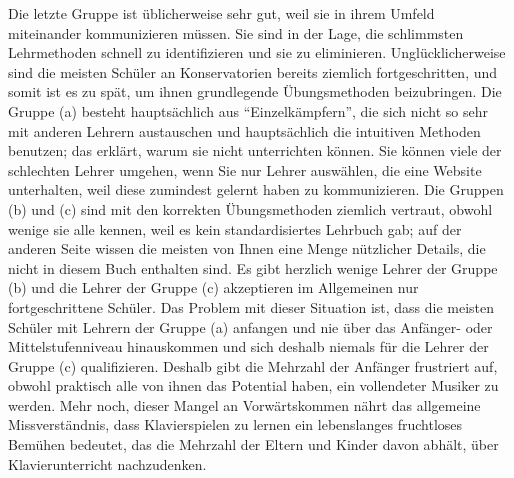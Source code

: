 Die letzte Gruppe ist üblicherweise sehr gut, weil sie in ihrem Umfeld miteinander kommunizieren müssen.
 Sie sind in der Lage, die schlimmsten Lehrmethoden schnell zu identifizieren und sie zu eliminieren.
 Unglücklicherweise sind die meisten Schüler an Konservatorien bereits ziemlich fortgeschritten, und somit ist es zu spät, um ihnen grundlegende Übungsmethoden beizubringen.
 Die Gruppe (a) besteht hauptsächlich aus \enquote{Einzelkämpfern}, die sich nicht so sehr mit anderen Lehrern austauschen und hauptsächlich die intuitiven Methoden benutzen; das erklärt, warum sie nicht unterrichten können.
 Sie können viele der schlechten Lehrer umgehen, wenn Sie nur Lehrer auswählen, die eine Website unterhalten, weil diese zumindest gelernt haben zu kommunizieren.
 Die Gruppen (b) und (c) sind mit den korrekten Übungsmethoden ziemlich vertraut, obwohl wenige sie alle kennen, weil es kein standardisiertes Lehrbuch gab; auf der anderen Seite wissen die meisten von Ihnen eine Menge nützlicher Details, die nicht in diesem Buch enthalten sind.
 Es gibt herzlich wenige Lehrer der Gruppe (b) und die Lehrer der Gruppe (c) akzeptieren im Allgemeinen nur fortgeschrittene Schüler.
 Das Problem mit dieser Situation ist, dass die meisten Schüler mit Lehrern der Gruppe (a) anfangen und nie über das Anfänger- oder Mittelstufenniveau hinauskommen und sich deshalb niemals für die Lehrer der Gruppe (c) qualifizieren.
 Deshalb gibt die Mehrzahl der Anfänger frustriert auf, obwohl praktisch alle von ihnen das Potential haben, ein vollendeter Musiker zu werden.
 Mehr noch, dieser Mangel an Vorwärtskommen nährt das allgemeine Missverständnis, dass Klavierspielen zu lernen ein lebenslanges fruchtloses Bemühen bedeutet, das die Mehrzahl der Eltern und Kinder davon abhält, über Klavierunterricht nachzudenken.
 


